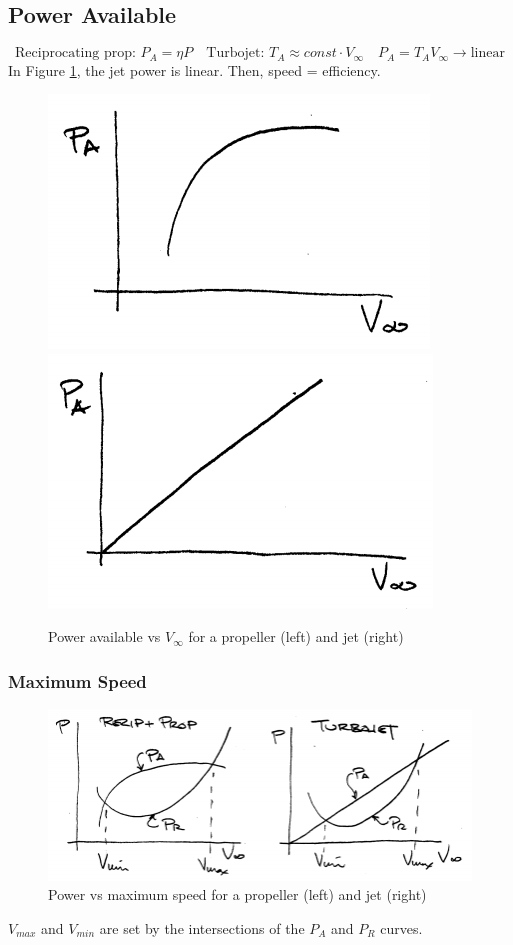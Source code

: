 \documentclass[draft=false, titlepage]{article}
\begin{document}
\subsection{Power Available}
\begin{equation*}
\text{Reciprocating prop: } P_A = \eta P \quad \text{Turbojet: } T_A \approx const\cdot  V_\infty\quad P_A = T_A V_\infty \rightarrow \text{linear}
\end{equation*}
In Figure \ref{fig:p75_PA}, the jet power is linear. Then, speed = efficiency.
 
 \begin{figure}[ht]
 	\centering
 	\includegraphics[width=0.3\linewidth]{Figures/p75_PAprop.PNG}
 	\includegraphics[width=0.3\linewidth]{Figures/p75_PAjet.PNG}
 	\caption{Power available vs $V_\infty$ for a propeller (left) and jet (right)}
 	\label{fig:p75_PA}
 \end{figure}

\subsubsection{Maximum Speed}
 \begin{figure}[ht]
	\centering
	\includegraphics[width=0.8\linewidth]{Figures/p75_maxSpeed}
	\caption{Power vs maximum speed for a propeller (left) and jet (right)}
	\label{fig:p75_maxSpeed}
\end{figure}

$V_{max}$ and $V_{min}$ are set by the intersections of the $P_A$ and $P_R$ curves.
\end{document}
